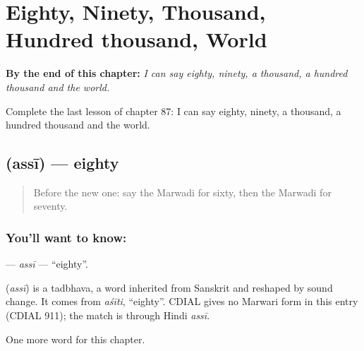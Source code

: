 
\chapter{Eighty, Ninety, Thousand, Hundred thousand, World}
\label{ch:mw-eighty-ninety-thousand-hundred-thousand-world}

\begin{chapteropening}
\textbf{By the end of this chapter:} \emph{I can say eighty, ninety, a thousand, a hundred thousand and the world.}

Complete the last lesson of chapter 87: I can say eighty, ninety, a thousand, a hundred thousand and the world.
\end{chapteropening}

\section[\texorpdfstring{\mw{अस्सी} (assī)}{अस्सी (assī)}]{ (assī) — eighty}

\label{lesson:MW-C87-assi}



\begin{quote}
Before the new one: say the Marwadi for sixty, then the Marwadi for seventy.
\end{quote}

\subsection*{You'll want to know: }
\textbf{} — \emph{assī} — \textquotedblleft{}eighty\textquotedblright{}.

\begin{cousinweb}
\textbf{} (\emph{assī}) is a tadbhava, a word inherited from Sanskrit and reshaped by sound change. It comes from \emph{aśīti}, \textquotedblleft{}eighty\textquotedblright{}. CDIAL gives no Marwari form in this entry (CDIAL 911); the match is through Hindi \emph{assī}.
\end{cousinweb}

\begin{grammarlens}[title={What you've built}]
One more word for this chapter.
\end{grammarlens}

